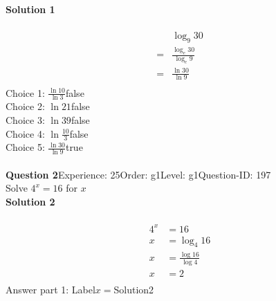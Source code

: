 \documentclass{article}
\begin{document}
\noindent\textbf{Solution 1}\\[2pt]
\\[-35pt]\begin{align*}
&\log_{9}30\\[2pt]
=&\displaystyle\frac{\log_{e}30}{\log_{e}9}\\[2pt]
=&\displaystyle\frac{\ln30}{\ln9}\\[-100pt]
\end{align*}
Choice 1: \hspace{20pt}$\displaystyle\frac{\ln10}{\ln3}$\hspace{20pt}false\\
Choice 2: \hspace{20pt}$\ln{21}$\hspace{20pt}false\\
Choice 3: \hspace{20pt}$\ln{39}$\hspace{20pt}false\\
Choice 4: \hspace{20pt}$\ln{\displaystyle\frac{10}{3}}$\hspace{20pt}false\\
Choice 5: \hspace{20pt}$\displaystyle\frac{\ln30}{\ln9}$\hspace{20pt}true\\
\\[4pt]
\noindent\textbf{Question 2}\hspace{20pt}Experience: 25\hspace{20pt}Order: g1\hspace{20pt}Level: g1\hspace{20pt}Question-ID: 197\\[2pt]
Solve $4^x=16$ for $x$\\[4pt]
\noindent\textbf{Solution 2}\\[2pt]
\\[-35pt]\begin{align*}
4^x&=16\\[2pt]
x&=\log_{4}16\\[2pt]
x&=\displaystyle\frac{\log16}{\log4}\\[2pt]
x&=2\\[-105pt]
\end{align*}
Answer part 1: \hspace{10pt}Label\hspace{10pt}$x=$\hspace{10pt}Solution\hspace{10pt}2\\
\end{document}
